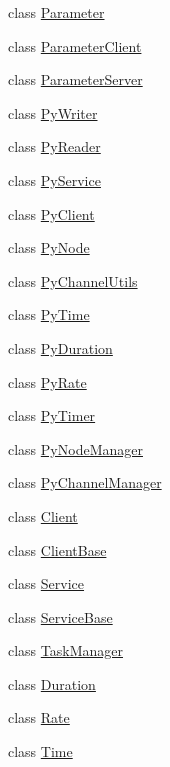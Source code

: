 \begin{DoxyCompactItemize}
\item 
class \hyperlink{classapollo_1_1cyber_1_1Parameter}{Parameter}
\item 
class \hyperlink{classapollo_1_1cyber_1_1ParameterClient}{Parameter\-Client}
\item 
class \hyperlink{classapollo_1_1cyber_1_1ParameterServer}{Parameter\-Server}
\item 
class \hyperlink{classapollo_1_1cyber_1_1PyWriter}{Py\-Writer}
\item 
class \hyperlink{classapollo_1_1cyber_1_1PyReader}{Py\-Reader}
\item 
class \hyperlink{classapollo_1_1cyber_1_1PyService}{Py\-Service}
\item 
class \hyperlink{classapollo_1_1cyber_1_1PyClient}{Py\-Client}
\item 
class \hyperlink{classapollo_1_1cyber_1_1PyNode}{Py\-Node}
\item 
class \hyperlink{classapollo_1_1cyber_1_1PyChannelUtils}{Py\-Channel\-Utils}
\item 
class \hyperlink{classapollo_1_1cyber_1_1PyTime}{Py\-Time}
\item 
class \hyperlink{classapollo_1_1cyber_1_1PyDuration}{Py\-Duration}
\item 
class \hyperlink{classapollo_1_1cyber_1_1PyRate}{Py\-Rate}
\item 
class \hyperlink{classapollo_1_1cyber_1_1PyTimer}{Py\-Timer}
\item 
class \hyperlink{classapollo_1_1cyber_1_1PyNodeManager}{Py\-Node\-Manager}
\item 
class \hyperlink{classapollo_1_1cyber_1_1PyChannelManager}{Py\-Channel\-Manager}
\item 
class \hyperlink{classapollo_1_1cyber_1_1Client}{Client}
\item 
class \hyperlink{classapollo_1_1cyber_1_1ClientBase}{Client\-Base}
\item 
class \hyperlink{classapollo_1_1cyber_1_1Service}{Service}
\item 
class \hyperlink{classapollo_1_1cyber_1_1ServiceBase}{Service\-Base}
\item 
class \hyperlink{classapollo_1_1cyber_1_1TaskManager}{Task\-Manager}
\item 
class \hyperlink{classapollo_1_1cyber_1_1Duration}{Duration}
\item 
class \hyperlink{classapollo_1_1cyber_1_1Rate}{Rate}
\item 
class \hyperlink{classapollo_1_1cyber_1_1Time}{Time}
\item 

\end{DoxyCompactItemize}

